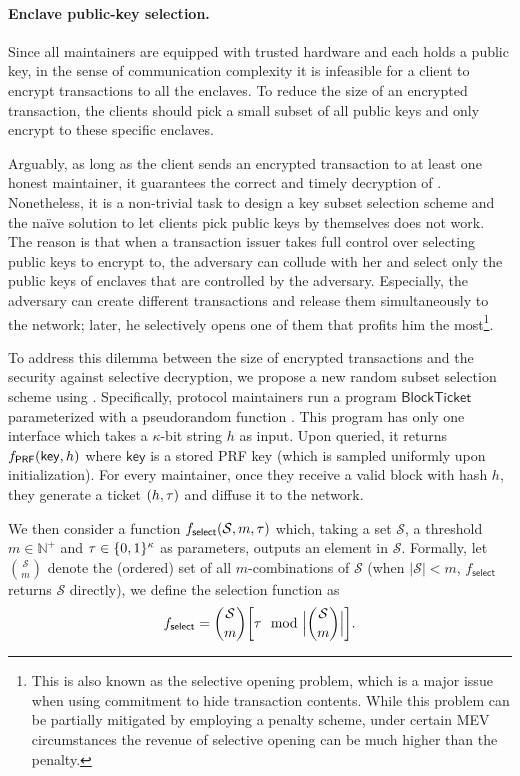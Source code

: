 \paragraph{Enclave public-key selection.}
%
Since all maintainers are equipped with trusted hardware and each holds a public key, in the sense of communication complexity it is infeasible for a client to encrypt transactions to all the enclaves.
%
To reduce the size of an encrypted transaction, the clients should pick a small subset of all public keys and only encrypt to these specific enclaves.

Arguably, as long as the client sends an encrypted transaction \tx to at least one honest maintainer, it guarantees the correct and timely decryption of \tx.
%
Nonetheless, it is a non-trivial task to design a key subset selection scheme and the na\"ive solution to let clients pick public keys by themselves does not work.
%
The reason is that when a transaction issuer takes full control over selecting public keys to encrypt to, the adversary can collude with her and select only the public keys of enclaves that are controlled by the adversary.
%
Especially, the adversary can create different transactions and release them simultaneously to the network; later, he selectively opens one of them that profits him the most\footnote{This is also known as the selective opening problem, which is a major issue when using commitment to hide transaction contents. While this problem can be partially mitigated by employing a penalty scheme, under certain MEV circumstances the revenue of selective opening can be much higher than the penalty.}.

To address this dilemma between the size of encrypted transactions and the security against selective decryption, we propose a new random subset selection scheme using \funcEnclave.
%
Specifically, protocol maintainers run a program $\mathsf{BlockTicket}$ parameterized with a pseudorandom function \fPRF.
%
This program has only one interface which takes a $\kappa$-bit string $h$ as input.
%
Upon queried, it returns $f_\mathsf{PRF}(\mathsf{key}, h)$ where $\mathsf{key}$ is a stored PRF key (which is sampled uniformly upon initialization).
%
For every maintainer, once they receive a valid block \block with hash $h$, they generate a ticket $(h, \mathsf{\tau})$ and diffuse it to the network.



We then consider a function $f_{\mathsf{select}}(\mathcal{S}, m, \mathsf{\tau})$ which, taking a set $\mathcal{S}$, a threshold $m \in \mathbb{N}^+$ and $\mathsf{\tau} \in \{0, 1\}^\kappa$ as parameters, outputs an element in $\mathcal{S}$.
%
Formally, let $\binom{\mathcal{S}}{m}$ denote the (ordered) set of all $m$-combinations of $\mathcal{S}$ (when $|\mathcal{S}| < m$, $f_{\mathsf{select}} $ returns $\mathcal{S}$ directly), we define the selection function as
%
\begin{equation*}
	f_{\mathsf{select}} = \binom{\mathcal{S}}{m} \bigg[\mathsf{\tau} \mod \Big|\binom{\mathcal{S}}{m} \Big| \bigg].
\end{equation*}

